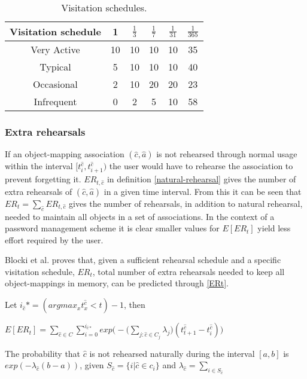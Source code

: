 \begin{table}
    \centering
\begin{tabular}{|c||c|c|c|c|c|}
    \hline
    Visitation schedule & 1 & $\frac{1}{3}$ & $\frac{1}{7}$ & $\frac{1}{31}$ & $\frac{1}{365}$ \\
    \hline \hline
    Very Active & 10 &10 &10 &10 & 35 \\
    \hline
    Typical & 5 & 10 & 10 & 10 & 40 \\
    \hline
    Occasional & 2 & 10 & 20 & 20 & 23 \\
    \hline
    Infrequent & 0 & 2 & 5 & 10 &  58 \\
    \hline
\end{tabular}
\caption{Visitation schedules.}
\label{users}
\end{table}

\subsubsection{Extra rehearsals}
If an object-mapping association $(\hat c, \hat a)$ is not rehearsed through normal usage within the interval $[t^{\hat c}_i, t^{\hat c}_{i+1})$ the user would have to rehearse the association to prevent forgetting it. $ER_{t,\hat c}$ in definition \ref{natural-rehearsal} gives the number of extra rehearsals of $(\hat c, \hat a)$ in a given time interval. From this it can be seen that $ER_t = \sum_{\hat c} ER_{t, \hat c}$ gives the number of rehearsals, in addition to natural rehearsal, needed to maintain all objects in a set of associations. In the context of a password management scheme it is clear smaller values for $E[ER_t]$ yield less effort required by the user.
\par Blocki et al.\cite{naturally-rehearsing} proves that, given a sufficient rehearsal schedule  and a specific visitation schedule, $ER_t$, total number of extra rehearsals needed to keep all object-mappings in memory, can be predicted through \autoref{ERt}. 


\begin{theorem}\label{ERt}
    \cite{naturally-rehearsing} Let $i_{\hat c}* = (arg max_x t^{\hat c}_x < t)- 1 $, then 

    $ E[ER_t] = \sum_{\hat c \in C} \sum^{i_{\hat c *}}_{i=0} exp\bigg(-\bigg(\sum\limits_{j:\hat c \in C_j} \lambda_j \bigg)(t^{\hat c}_{t+1} - t^{\hat c}_i)\bigg)$
\end{theorem}

\begin{lemma}
    \cite{naturally-rehearsing} The probability that $\hat c$ is not rehearsed naturally during the interval $[a,b]$ is $exp(-\lambda_{\hat c} (b-a))$, given $S_{\hat c} = \{i \vert \hat c \in c_i \}$ and $\lambda_{\hat c}= \sum_{i \in S_{\hat c}}$
\end{lemma}














